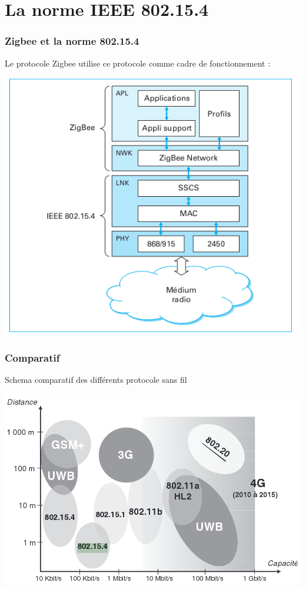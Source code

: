 \documentclass{beamer}
\begin{document}
 
  
 \section{La norme IEEE 802.15.4}
  \begin{frame}
    \frametitle{Zigbee et la norme 802.15.4}
    Le protocole Zigbee utilise ce protocole comme cadre de fonctionnement :
      \begin{center}
       \includegraphics[scale=0.4]{OSI-Zigbee.png}
      \end{center}  
  \end{frame}

  \begin{frame}
    \frametitle{Comparatif}
    \begin{block}{Schema comparatif des différents protocole sans fil}
      \begin{center}
       \includegraphics[scale=0.3]{Range.png}
      \end{center} 
    \end{block}
  \end{frame}
  
\end{document}
